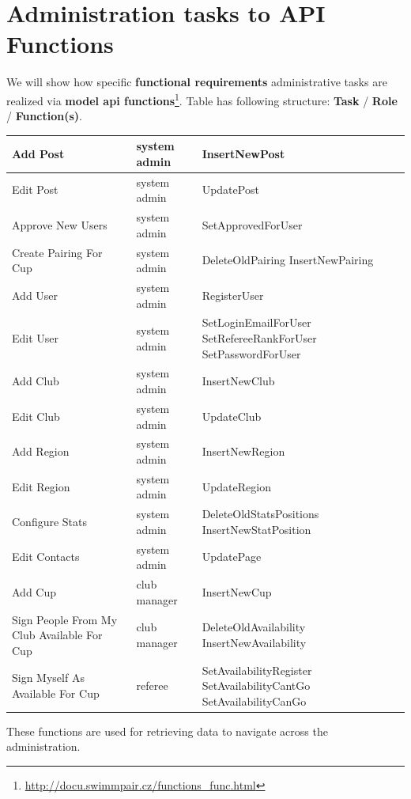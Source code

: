 \section {Administration tasks to API Functions}
We will show how specific \textbf{functional requirements} administrative tasks are realized via \textbf{model api functions}\footnote{\url{http://docu.swimmpair.cz/functions_func.html}}.
\newline
Table has following structure: \textbf{Task} / \textbf{Role} / \textbf{Function(s)}.
\newline
\begin{tabularx}{1.0\textwidth} { 
  | >{\raggedright\arraybackslash}X 
  | >{\centering\arraybackslash}X 
  | >{\raggedright\arraybackslash}X | }
 \hline
 Add Post & system admin& InsertNewPost \\
 \hline
 Edit Post  & system admin  & UpdatePost \\
 \hline
 Approve New Users & system admin & SetApprovedForUser \\
 \hline
 Create Pairing For Cup & system admin & DeleteOldPairing
InsertNewPairing\\
 \hline
 Add User & system admin & RegisterUser \\
 \hline
 Edit User & system admin &
 SetLoginEmailForUser
 SetRefereeRankForUser
 SetPasswordForUser\\
 \hline
 Add Club & system admin & InsertNewClub \\
 \hline
 Edit Club & system admin & UpdateClub \\
 \hline
 Add Region & system admin & InsertNewRegion \\
 \hline
 Edit Region & system admin & UpdateRegion \\
 \hline
 Configure Stats & system admin & DeleteOldStatsPositions
 InsertNewStatPosition \\
 \hline
 Edit Contacts & system admin & UpdatePage \\
 \hline
 Add Cup & club manager & InsertNewCup \\
 \hline
 Sign People From My Club Available For Cup & club manager & DeleteOldAvailability
 InsertNewAvailability \\
 \hline
 Sign Myself As Available For Cup & referee & SetAvailabilityRegister
 SetAvailabilityCantGo 
 SetAvailabilityCanGo \\
\hline
\end{tabularx}
These functions are used for retrieving data to navigate across the administration.
